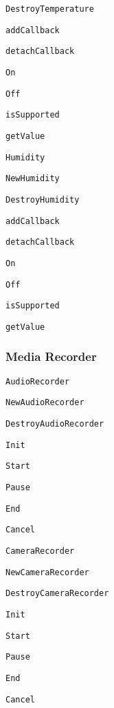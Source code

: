 \begin{DoxyItemize}
\begin{DoxyItemize}
\item {\tt Destroy\-Temperature}
\item {\tt add\-Callback}
\item {\tt detach\-Callback}
\item {\tt On}
\item {\tt Off}
\item {\tt is\-Supported}
\item {\tt get\-Value}
\end{DoxyItemize}
\item {\tt Humidity}
\begin{DoxyItemize}
\item {\tt New\-Humidity}
\item {\tt Destroy\-Humidity}
\item {\tt add\-Callback}
\item {\tt detach\-Callback}
\item {\tt On}
\item {\tt Off}
\item {\tt is\-Supported}
\item {\tt get\-Value}
\end{DoxyItemize}
\end{DoxyItemize}

\subsubsection*{Media Recorder}


\begin{DoxyItemize}
\item {\tt Audio\-Recorder}
\begin{DoxyItemize}
\item {\tt New\-Audio\-Recorder}
\item {\tt Destroy\-Audio\-Recorder}
\item {\tt Init}
\item {\tt Start}
\item {\tt Pause}
\item {\tt End}
\item {\tt Cancel}
\end{DoxyItemize}
\item {\tt Camera\-Recorder}
\begin{DoxyItemize}
\item {\tt New\-Camera\-Recorder}
\item {\tt Destroy\-Camera\-Recorder}
\item {\tt Init}
\item {\tt Start}
\item {\tt Pause}
\item {\tt End}
\item {\tt Cancel}
\end{DoxyItemize}
\end{DoxyItemize}

